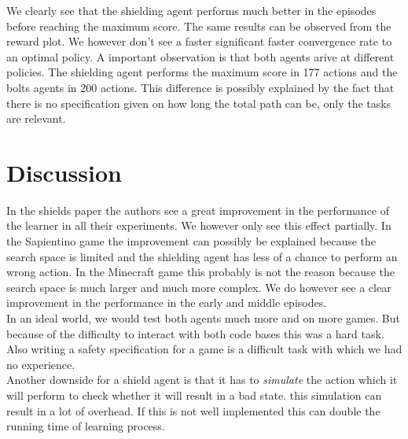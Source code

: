 \documentclass[letterpaper]{article}
\begin{document}
We clearly see that the shielding agent performs much better in the episodes before reaching the maximum score. The same results can be observed from the reward plot. We however don't see a faster significant faster convergence rate to an optimal policy. A important observation is that both agents arive at different policies. The shielding agent performs the maximum score in 177 actions and the bolts agents in 200 actions. This difference is possibly explained by the fact that there is no specification given on how long the total path can be, only the tasks are relevant. 

\section{Discussion} %
In the shields paper the authors see a great improvement in the performance of the learner in all their experiments. We however only see this effect partially. In the Sapientino game the improvement can possibly be explained because the search space is limited and the shielding agent has less of a chance to perform an wrong action. In the Minecraft game this probably is not the reason because the search space is much larger and much more complex. We do however see a clear improvement in the performance in the early and middle episodes.  \\
In an ideal world, we would test both agents much more and on more games. But because of the difficulty to interact with both code bases this was a hard task. Also writing a safety specification for a game is a difficult task with which we had no experience. \\
Another downside for a shield agent is that it has to \textit{simulate} the action which it will perform to check whether it will result in a bad state. this simulation can result in a lot of overhead. If this is not well implemented this can double the running time of learning process.
\end{document}
